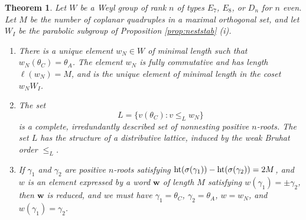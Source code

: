 \documentclass[11pt]{amsart}
\theoremstyle{plain}
\newtheorem{theorem}{Theorem}[section]
\theoremstyle{definition}
\theoremstyle{remark}
\numberwithin{equation}{subsection}
\newcommand{\bfw}{\mathbf{w}}
\newcommand{\coplanar}{coplanar\xspace}
\newcommand{\rootht}{\text{\rm ht}}
\begin{document}
\begin{theorem}\label{thm:nonnest}
Let $W$ be a Weyl group of rank $n$ of types $E_7$, $E_8$, or $D_n$ for $n$
even. Let $M$ be the number of \coplanar quadruples in a maximal orthogonal
set, and let $W_I$ be the parabolic subgroup of Proposition \ref{prop:neststab}
(i).
\begin{enumerate}
    \item[{\rm (i)}]{There is a unique element $w_N \in W$ of minimal length
     such that $w_N(\theta_C) = \theta_A$.  The element $w_N$ is fully
 commutative and has length $\ell(w_N) = M$, and is the unique element of
 minimal length in the coset $w_N W_I$.}
\item[{\rm (ii)}]{The set $$ L= \{v(\theta_C) : v \leq_L w_N\} $$ is a complete,
     irredundantly described set of nonnesting positive $n$-roots. The set $L$
 has the structure of a distributive lattice, induced by the weak Bruhat order
 $\leq_L$.}
\item[{\rm (iii)}]{If $\gamma_1$ and $\gamma_2$ are positive $n$-roots
     satisfying $\rootht(\sigma(\gamma_1)) - \rootht(\sigma(\gamma_2)) = 2M$,
     and $w$ is an element expressed by a word $\bfw$ of length $M$ satisfying
     $w(\gamma_1) = \pm\gamma_2$, then $\bfw$ is reduced, and we must have
     $\gamma_1 = \theta_C$, $\gamma_2 = \theta_A$, $w = w_N$, and $w(\gamma_1) =
 \gamma_2$.}
\end{enumerate}
\end{theorem}
\end{document}
